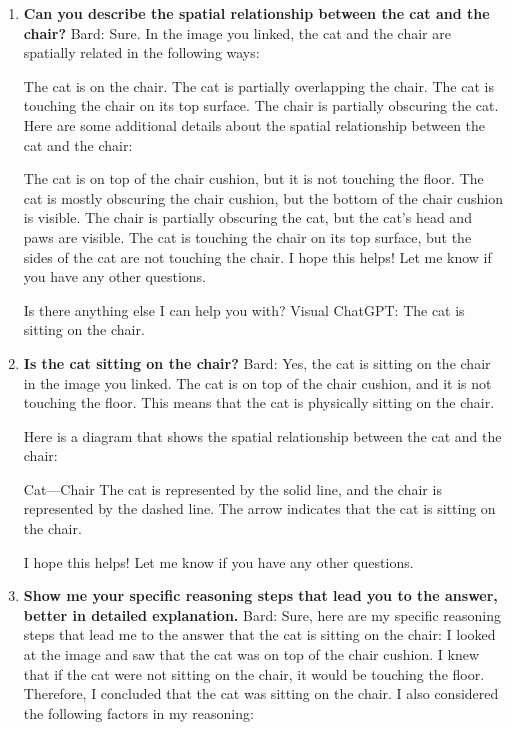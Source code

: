     \begin{enumerate}
        \item \textbf{Can you describe the spatial relationship between the cat and the chair?}
        \subitem Bard: Sure. In the image you linked, the cat and the chair are spatially related in the following ways:

        The cat is on the chair.
        The cat is partially overlapping the chair.
        The cat is touching the chair on its top surface.
        The chair is partially obscuring the cat.
        Here are some additional details about the spatial relationship between the cat and the chair:
        
        The cat is on top of the chair cushion, but it is not touching the floor.
        The cat is mostly obscuring the chair cushion, but the bottom of the chair cushion is visible.
        The chair is partially obscuring the cat, but the cat's head and paws are visible.
        The cat is touching the chair on its top surface, but the sides of the cat are not touching the chair.
        I hope this helps! Let me know if you have any other questions.
        
        Is there anything else I can help you with?
        \subitem Visual ChatGPT: The cat is sitting on the chair.
        \item \textbf{Is the cat sitting on the chair?}
        \subitem Bard:     
        Yes, the cat is sitting on the chair in the image you linked. The cat is on top of the chair cushion, and it is not touching the floor. This means that the cat is physically sitting on the chair.

        Here is a diagram that shows the spatial relationship between the cat and the chair:

        Cat---Chair
        The cat is represented by the solid line, and the chair is represented by the dashed line. The arrow indicates that the cat is sitting on the chair.

        I hope this helps! Let me know if you have any other questions.
        \item \textbf{Show me your specific reasoning steps that lead you to the answer, better in detailed explanation.}
        \subitem Bard: 
        Sure, here are my specific reasoning steps that lead me to the answer that the cat is sitting on the chair:
        I looked at the image and saw that the cat was on top of the chair cushion.
        I knew that if the cat were not sitting on the chair, it would be touching the floor.
        Therefore, I concluded that the cat was sitting on the chair.
        I also considered the following factors in my reasoning:


\end{enumerate}
